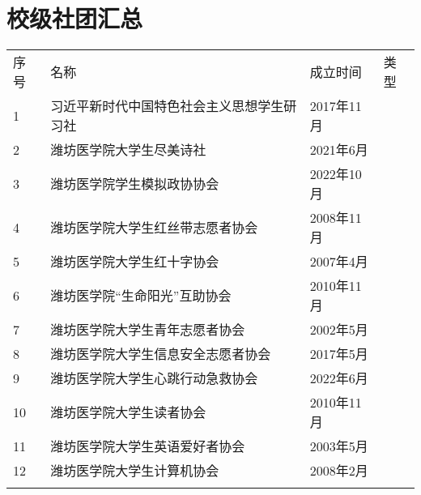 \chapter[校级社团汇总]{校级社团汇总}
\label{community_summary}
\begin{center}
    \begin{tabular}{|>{\centering\arraybackslash}p{2em}|>{\centering\arraybackslash}p{20em}|%
        >{\centering\arraybackslash}p{6em}|>{\centering\arraybackslash}p{5em}|}
        \Xhline{1.2pt}
        序号 & 名称                            & 成立时间     & 类型                     \\
        \Xhline{1.2pt}
        1  & \small{习近平新时代中国特色社会主义思想学生研习社} & 2017年11月 & \multirow{3}{*}{思想政治类} \\
        \cline{1-3}
        2  & 潍坊医学院大学生尽美诗社                  & 2021年6月  &                        \\
        \cline{1-3}
        3  & 潍坊医学院学生模拟政协协会                 & 2022年10月 &                        \\
        \Xhline{1.2pt}
        4  & 潍坊医学院大学生红丝带志愿者协会              & 2008年11月 & \multirow{6}{*}{志愿公益类} \\
        \cline{1-3}
        5  & 潍坊医学院大学生红十字协会                 & 2007年4月  &                        \\
        \cline{1-3}
        6  & 潍坊医学院“生命阳光”互助协会               & 2010年11月 &                        \\
        \cline{1-3}
        7  & 潍坊医学院大学生青年志愿者协会               & 2002年5月  &                        \\
        \cline{1-3}
        8  & 潍坊医学院大学生信息安全志愿者协会             & 2017年5月  &                        \\
        \cline{1-3}
        9  & 潍坊医学院大学生心跳行动急救协会              & 2022年6月  &                        \\
        \Xhline{1.2pt}
        10 & 潍坊医学院大学生读者协会                  & 2010年11月 & \multirow{5}{*}{学术科技类} \\
        \cline{1-3}
        11 & 潍坊医学院大学生英语爱好者协会               & 2003年5月  &                        \\
        \cline{1-3}
        12 & 潍坊医学院大学生计算机协会                 & 2008年2月  &                        \\
        \cline{1-3}

\end{tabular}
\end{center}
